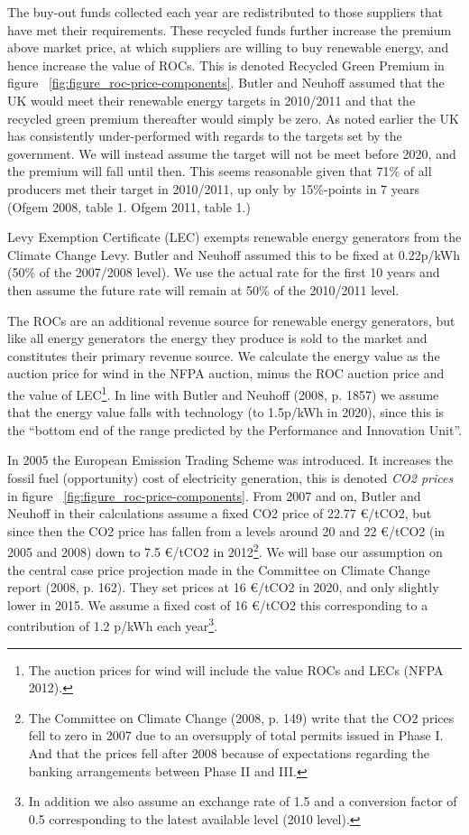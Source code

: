 \documentclass[a4paper, 12pt]{article}
\begin{document}
The buy-out funds collected each year are redistributed to those suppliers that have met their requirements. These recycled funds further increase the premium above market price, at which suppliers are willing to buy renewable energy, and hence increase the value of ROCs. This is denoted Recycled Green Premium in figure ~\ref{fig:figure_roc-price-components}. Butler and Neuhoff assumed that the UK would meet their renewable energy targets in 2010/2011 and that the recycled green premium thereafter would simply be zero. As noted earlier the UK has consistently under-performed with regards to the targets set by the government. We will instead assume the target will not be meet before 2020, and the premium will fall until then. This seems reasonable given that 71\% of all producers met their target in 2010/2011, up only by 15\%-points in 7 years (Ofgem 2008, table 1. Ofgem 2011, table 1.) 

Levy Exemption Certificate (LEC) exempts renewable energy generators from the Climate Change Levy. Butler and Neuhoff assumed this to be fixed at 0.22p/kWh (50\% of the 2007/2008 level). We use the actual rate for the first 10 years and then assume the future rate will remain at 50\% of the 2010/2011 level.

The ROCs are an additional revenue source for renewable energy generators, but like all energy generators the energy they produce is sold to the market and constitutes their primary revenue source. We calculate the energy value as the auction price for wind in the NFPA auction, minus the ROC auction price and the value of LEC\footnote{The auction prices for wind will include the value ROCs and LECs (NFPA 2012).}. In line with Butler and Neuhoff (2008, p. 1857) we assume that the energy value falls with technology (to 1.5p/kWh in 2020), since this is the ``bottom end of the range predicted by the Performance and Innovation Unit''.

In 2005 the European Emission Trading Scheme was introduced. It increases the fossil fuel (opportunity) cost of electricity generation, this is denoted \emph{CO2 prices} in figure ~\ref{fig:figure_roc-price-components}. From 2007 and on, Butler and Neuhoff in their calculations assume a fixed CO2 price of 22.77 €/tCO2, but since then the CO2 price has fallen from a levels around 20 and 22 €/tCO2 (in 2005 and 2008) down to 7.5 €/tCO2 in 2012\footnote{The Committee on Climate Change (2008, p. 149) write that the CO2 prices fell to zero in 2007 due to an oversupply of total permits issued in Phase I. And that the prices fell after 2008 because of expectations regarding the banking arrangements between Phase II and III.}. We will base our assumption on the central case price projection made in the Committee on Climate Change report (2008, p. 162). They set prices at 16 €/tCO2 in 2020, and only slightly lower in 2015. We assume a fixed cost of 16 €/tCO2 this corresponding to a contribution of 1.2 p/kWh each year\footnote{In addition we also assume an exchange rate of 1.5 and a conversion factor of 0.5 corresponding to the latest available level (2010 level).}.
\end{document}
